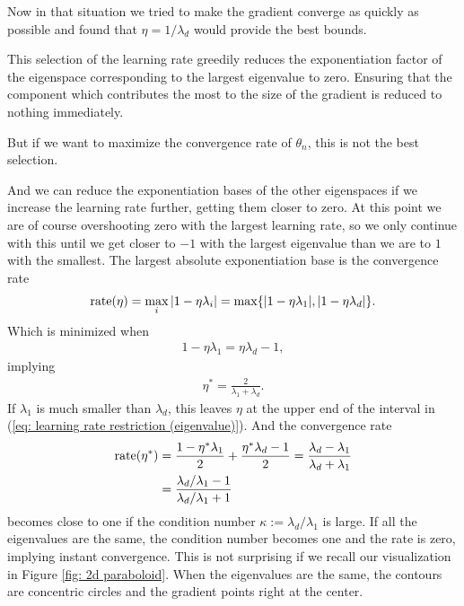 Now in that situation we tried to make the gradient converge as quickly as
possible and found that \(\eta=1/\lambda_d\) would provide the best bounds.

This selection of the learning rate greedily reduces the exponentiation factor
of the eigenspace corresponding to the largest eigenvalue to zero. Ensuring
that the component which contributes the most to the size of the gradient is
reduced to nothing immediately.

But if we want to maximize the convergence rate of \(\theta_n\), this is not
the best selection.

And we can reduce the exponentiation bases of the other eigenspaces if we
increase the learning rate further, getting them closer to zero. At this point
we are of course overshooting zero with the largest learning rate, so we only
continue with this until we get closer to \(-1\) with the largest eigenvalue
than we are to \(1\) with the smallest. The largest absolute exponentiation base
is the convergence rate
%
\begin{align*}
	\text{rate}(\eta)=\max_{i} |1-\eta\lambda_i| = \max\{|1-\eta\lambda_1|, |1-\eta\lambda_d|\}.
\end{align*}
%
Which is minimized when
%
\begin{align*}
	1-\eta\lambda_1 = \eta\lambda_d -1,
\end{align*}
%
implying
%
\begin{align*}
	\eta^* = \frac{2}{\lambda_1 + \lambda_d}.
\end{align*}
%
If \(\lambda_1\) is much smaller than \(\lambda_d\), this leaves \(\eta\)
at the upper end of the interval in (\ref{eq: learning rate restriction
(eigenvalue)}). And the convergence rate
%
\begin{align*}
	\text{rate}(\eta^*)
	&= \frac{1-\eta^* \lambda_1}{2} + \frac{\eta^*\lambda_d -1}{2}
	= \frac{\lambda_d - \lambda_1}{\lambda_d + \lambda_1}\\
	&= \frac{\lambda_d/\lambda_1-1}{\lambda_d/\lambda_1+1}
\end{align*}
%
becomes close to one if the condition number \(\kappa:=\lambda_d/\lambda_1\)
is large.
If all the eigenvalues are the same, the condition number becomes one and the
rate is zero, implying instant convergence. This is not surprising if we recall
our visualization in Figure \ref{fig: 2d paraboloid}. When the eigenvalues are
the same, the contours are concentric circles and the gradient points right at
the center.

